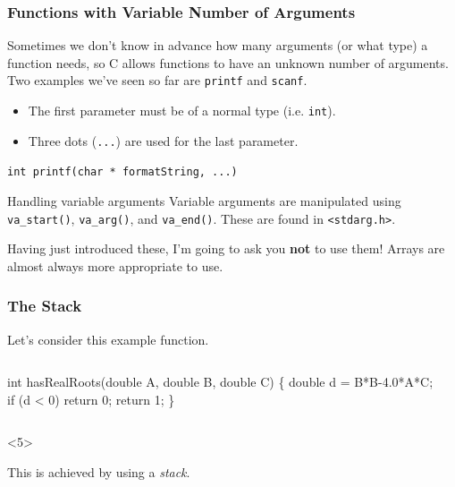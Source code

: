 \documentclass[table]{beamer}
\newif\ifschigh\schighfalse
\newcommand{\kw}[1]{\ifschigh\textcolor{red}{#1}\else\textcolor{keyword}{#1}\fi}
\newcommand{\kt}[1]{\ifschigh\textcolor{red}{#1}\else\textcolor{ctext}{#1}\fi}
\begin{document}
\begin{frame}
\frametitle{Functions with Variable Number of Arguments}
Sometimes we don't know in advance how many arguments (or what type) a function needs, so C allows functions to have an unknown number of arguments. Two examples we've seen so far are {\tt printf} and {\tt scanf}.

\begin{itemize}
\item The first parameter must be of a normal type (i.e. \kw{\tt int}).
\item Three dots ({\tt ...}) are used for the last parameter.
\end{itemize}
\begin{center}
{\tt \kw{int} printf(\kw{char} * formatString, ...)}
\end{center}
\begin{block}{Handling variable arguments}
Variable arguments are manipulated using {\tt va\_start()}, {\tt va\_arg()},
and {\tt va\_end()}. These are found in \kt{\tt <stdarg.h>}.
\end{block}

\begin{alertblock}{}
Having just introduced these, I'm going to ask you {\bf not} to use them! Arrays are almost always more appropriate to use.
\end{alertblock}
\end{frame}

\begin{frame}[fragile]
\frametitle{The Stack}
Let's consider this example function.
\begin{columns}
\begin{column}{5cm}
\begin{semiverbatim}
\kw{int} hasRealRoots(\alert<2>{\kw{double} A},
       \alert<2>{\kw{double} B, \kw{double} C})
\{
   \alert<3>{\kw{double} d} = B*B-4.0*A*C;
   \kw{if} (d < 0) \alert<4>{\kw{return}} 0;
   \alert<4>{\kw{return}} 1;
\}
\end{semiverbatim}
\end{column}
\begin{column}{5cm}
\end{column}
\end{columns}
\vspace{0.1in}
\begin{block}<5>{}
\begin{center}
\alert<5>{This is achieved by using a \emph{stack}.}
\end{center}
\end{block}
\end{frame}
\end{document}
